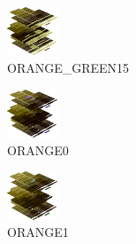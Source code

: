 \hspace{0.1cm}
\begin{minipage}[b]{0.15\linewidth}
\begin{figure}[H]                                                          
  \centering                                                             
  \begin{adjustbox}{width=1.5cm,center}                                   
  \includegraphics[width=1.5cm]{src/colorspace_colourflow/flows/colourflow_239-45.png}%
  \end{adjustbox}                                                        
\caption*{ORANGE\_GREEN15}                                           
\end{figure}                                                               
\end{minipage}
\hspace{0.1cm}
\begin{minipage}[b]{0.15\linewidth}
\begin{figure}[H]                                                          
  \centering                                                             
  \begin{adjustbox}{width=1.5cm,center}                                   
  \includegraphics[width=1.5cm]{src/colorspace_colourflow/flows/colourflow_240-45.png}%
  \end{adjustbox}                                                        
\caption*{ORANGE0}                                           
\end{figure}                                                               
\end{minipage}
\hspace{0.1cm}
\begin{minipage}[b]{0.15\linewidth}
\begin{figure}[H]                                                          
  \centering                                                             
  \begin{adjustbox}{width=1.5cm,center}                                   
  \includegraphics[width=1.5cm]{src/colorspace_colourflow/flows/colourflow_241-45.png}%
  \end{adjustbox}                                                        
\caption*{ORANGE1}                                           
\end{figure}                                                               
\end{minipage}
